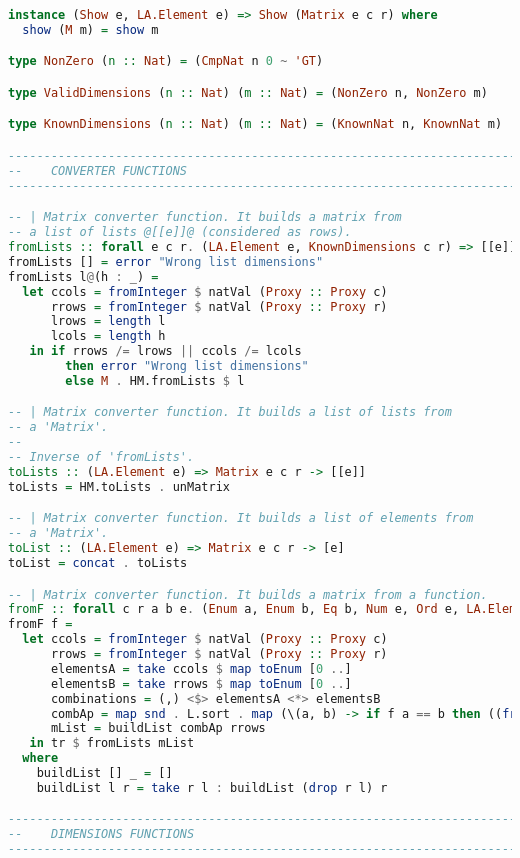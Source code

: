 \documentclass[
  oneside,
  11pt, a4paper,
  footinclude=true,
  headinclude=true,
  cleardoublepage=empty
]{scrbook}
\theoremstyle{definition}
\theoremstyle{definition}
\begin{document}
\begin{lstlisting}[language=Haskell, caption={Matrix.Internal},captionpos=b]
instance (Show e, LA.Element e) => Show (Matrix e c r) where
  show (M m) = show m

type NonZero (n :: Nat) = (CmpNat n 0 ~ 'GT)

type ValidDimensions (n :: Nat) (m :: Nat) = (NonZero n, NonZero m)

type KnownDimensions (n :: Nat) (m :: Nat) = (KnownNat n, KnownNat m)

-------------------------------------------------------------------------------
--    CONVERTER FUNCTIONS
-------------------------------------------------------------------------------

-- | Matrix converter function. It builds a matrix from
-- a list of lists @[[e]]@ (considered as rows).
fromLists :: forall e c r. (LA.Element e, KnownDimensions c r) => [[e]] -> Matrix e c r
fromLists [] = error "Wrong list dimensions"
fromLists l@(h : _) =
  let ccols = fromInteger $ natVal (Proxy :: Proxy c)
      rrows = fromInteger $ natVal (Proxy :: Proxy r)
      lrows = length l
      lcols = length h
   in if rrows /= lrows || ccols /= lcols
        then error "Wrong list dimensions"
        else M . HM.fromLists $ l

-- | Matrix converter function. It builds a list of lists from
-- a 'Matrix'.
--
-- Inverse of 'fromLists'.
toLists :: (LA.Element e) => Matrix e c r -> [[e]]
toLists = HM.toLists . unMatrix

-- | Matrix converter function. It builds a list of elements from
-- a 'Matrix'.
toList :: (LA.Element e) => Matrix e c r -> [e]
toList = concat . toLists

-- | Matrix converter function. It builds a matrix from a function.
fromF :: forall c r a b e. (Enum a, Enum b, Eq b, Num e, Ord e, LA.Element e, KnownNat c, KnownNat r) => (a -> b) -> Matrix e c r
fromF f =
  let ccols = fromInteger $ natVal (Proxy :: Proxy c)
      rrows = fromInteger $ natVal (Proxy :: Proxy r)
      elementsA = take ccols $ map toEnum [0 ..]
      elementsB = take rrows $ map toEnum [0 ..]
      combinations = (,) <$> elementsA <*> elementsB
      combAp = map snd . L.sort . map (\(a, b) -> if f a == b then ((fromEnum a, fromEnum b), 1) else ((fromEnum a, fromEnum b), 0)) $ combinations
      mList = buildList combAp rrows
   in tr $ fromLists mList
  where
    buildList [] _ = []
    buildList l r = take r l : buildList (drop r l) r

-------------------------------------------------------------------------------
--    DIMENSIONS FUNCTIONS
-------------------------------------------------------------------------------


\end{lstlisting}
\end{document}
